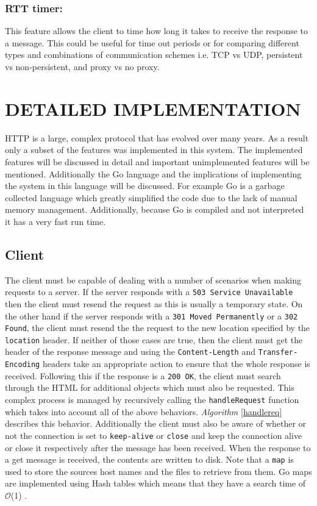 \documentclass[10pt,twocolumn]{witseiepaper}
\begin{document}
	\subsubsection{RTT timer:}

	This feature allows the client to time how long it takes to receive the response to a message. This could be useful for time out periods or for comparing different types and combinations of communication schemes i.e. TCP vs UDP, persistent vs non-persistent, and proxy vs no proxy.

\section{DETAILED IMPLEMENTATION}

HTTP is a large, complex protocol that has evolved over many years. As a result only a subset of the features was implemented in this system. The implemented features will be discussed in detail and important unimplemented features will be mentioned. Additionally the Go language and the implications of implementing the system in this language will be discussed. For example Go is a garbage collected language which greatly simplified the code due to the lack of manual memory management. Additionally, because Go is compiled and not interpreted it has a very fast run time.

	\subsection{Client}

	The client must be capable of dealing with a number of scenarios when making requests to a server. If the server responds with a \texttt{503 Service Unavailable} then the client must resend the request as this is usually a temporary state. On the other hand if the server responds with a \texttt{301 Moved Permanently} or a \texttt{302 Found}, the client must resend the the request to the new location specified by the \texttt{location} header. If neither of those cases are true, then the client must get the header of the response message and using the \texttt{Content-Length} and \texttt{Transfer-Encoding} headers take an appropriate action to ensure that the whole response is received. Following this if the response is a \texttt{200 OK}, the client must search through the HTML for additional objects which must also be requested. This complex process is managed by recursively calling the \texttt{handleRequest} function which takes into account all of the above behaviors. \emph{Algorithm} \ref{handlereq} describes this behavior. Additionally the client must also be aware of whether or not the connection is set to \texttt{keep-alive} or \texttt{close} and keep the connection alive or close it respectively after the message has been received. When the response to a get message is received, the contents are written to disk. Note that a \texttt{map} is used to store the sources host names and the files to retrieve from them. Go maps are implemented using Hash tables which means that they have a search time of $\mathcal{O}$(1) \cite{map}.
\end{document}
